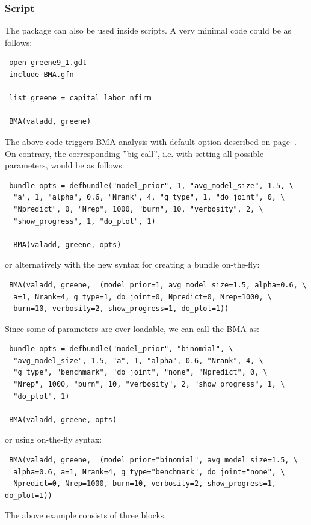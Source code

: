 \subsubsection{Script}
The  package can also be used inside  scripts.
A very minimal code could be as follows:
%
\begin{lstlisting}
 open greene9_1.gdt
 include BMA.gfn
  
 list greene = capital labor nfirm
 
 BMA(valadd, greene)
\end{lstlisting}
The above code triggers BMA analysis with default option
described on page~\pageref{sec:default_option_bundle}.
On contrary, the corresponding ''big call'', i.e. with
setting all possible parameters, would be as follows:
\begin{lstlisting}
 bundle opts = defbundle("model_prior", 1, "avg_model_size", 1.5, \
  "a", 1, "alpha", 0.6, "Nrank", 4, "g_type", 1, "do_joint", 0, \
  "Npredict", 0, "Nrep", 1000, "burn", 10, "verbosity", 2, \
  "show_progress", 1, "do_plot", 1)
 
  BMA(valadd, greene, opts)
\end{lstlisting}

or alternatively with the new syntax for creating a bundle
on-the-fly:
\begin{lstlisting}
 BMA(valadd, greene, _(model_prior=1, avg_model_size=1.5, alpha=0.6, \
  a=1, Nrank=4, g_type=1, do_joint=0, Npredict=0, Nrep=1000, \
  burn=10, verbosity=2, show_progress=1, do_plot=1))
\end{lstlisting}

Since some of parameters are over-loadable, we can call
the BMA as:
\begin{lstlisting}
 bundle opts = defbundle("model_prior", "binomial", \
  "avg_model_size", 1.5, "a", 1, "alpha", 0.6, "Nrank", 4, \
  "g_type", "benchmark", "do_joint", "none", "Npredict", 0, \
  "Nrep", 1000, "burn", 10, "verbosity", 2, "show_progress", 1, \
  "do_plot", 1)

 BMA(valadd, greene, opts)
\end{lstlisting}
or using on-the-fly syntax:
\begin{lstlisting}
 BMA(valadd, greene, _(model_prior="binomial", avg_model_size=1.5, \
  alpha=0.6, a=1, Nrank=4, g_type="benchmark", do_joint="none", \
  Npredict=0, Nrep=1000, burn=10, verbosity=2, show_progress=1, do_plot=1))
\end{lstlisting}

The above example consists of three blocks.


